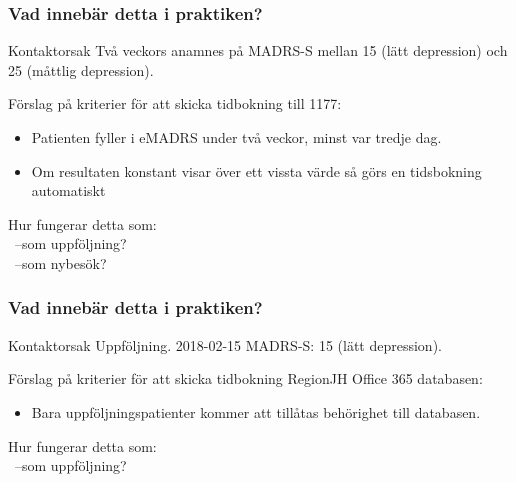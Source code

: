 \documentclass[english]{beamer}
\begin{document}
\begin{frame}
\frametitle{Vad innebär detta i praktiken?}
	\begin{block}{Kontaktorsak} 
	\scriptsize{
	 Två veckors anamnes på MADRS-S mellan 15 (lätt depression) och 25 (måttlig depression).\\
	}
	\end{block}
	Förslag på kriterier för att skicka tidbokning till 1177:
	\begin{itemize}
		\item Patienten fyller i eMADRS under två veckor, minst var tredje dag.
		\item Om resultaten konstant visar över ett vissta värde så görs en tidsbokning automatiskt
	\end{itemize}
	\textcolor{lila}{Hur fungerar detta som:}\\
	\textcolor{lila}{\ --som uppföljning?}\\
	\textcolor{lila}{\ --som nybesök?}
\end{frame}

\begin{frame}
\frametitle{Vad innebär detta i praktiken?}
	\begin{block}{Kontaktorsak} 
	\scriptsize{
	 Uppföljning. 2018-02-15 MADRS-S: 15 (lätt depression).\\
	}
	\end{block}
	Förslag på kriterier för att skicka tidbokning RegionJH Office 365 databasen:
	\begin{itemize}
		\item Bara uppföljningspatienter kommer att tillåtas behörighet till databasen.
	\end{itemize}
	\textcolor{lila}{Hur fungerar detta som:}\\
	\textcolor{lila}{\ --som uppföljning?}\\
\end{frame}
\end{document}
